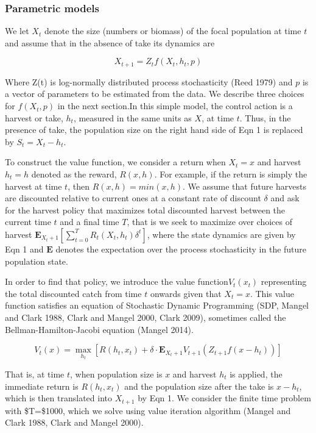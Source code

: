 \documentclass[author-year, 12pt,review]{elsarticle} %
\begin{document}
\subsubsection{Parametric models}\label{parametric-models}

We let $X_t$ denote the size (numbers or biomass) of the focal
population at time $t$ and assume that in the absence of take its
dynamics are

\[ X_{t+1}= Z_t f(X_t, h_t, p) \]

Where Z(t) is log-normally distributed process stochasticity (Reed 1979)
and $p$ is a vector of parameters to be estimated from the data. We
describe three choices for $f(X_t,p)$ in the next section.In this simple
model, the control action is a harvest or take, $h_t$, measured in the
same units as $X$, at time $t$. Thus, in the presence of take, the
population size on the right hand side of Eqn 1 is replaced by
$S_t=X_t-h_t$.

To construct the value function, we consider a return when $X_t=x$ and
harvest $h_t=h$ denoted as the reward, $R(x,h)$. For example, if the
return is simply the harvest at time $t$, then $R(x,h)=min(x,h)$. We
assume that future harvests are discounted relative to current ones at a
constant rate of discount $\delta$ and ask for the harvest policy that
maximizes total discounted harvest between the current time $t$ and a
final time $T$, that is we seek to maximize over choices of harvest
$\mathbf{E}_{X_t+1} [ \sum_{t = 0}^{T}  R_t(X_t, h_t) \delta^t]$, where
the state dynamics are given by Eqn 1 and $\mathbf{E}$ denotes the
expectation over the process stochasticity in the future population
state.

In order to find that policy, we introduce the value function$V_t(x_t)$
representing the total discounted catch from time $t$ onwards given that
$X_t=x$. This value function satisfies an equation of Stochastic Dynamic
Programming (SDP, Mangel and Clark 1988, Clark and Mangel 2000, Clark
2009), sometimes called the Bellman-Hamilton-Jacobi equation (Mangel
2014).

\begin{equation}
V_t(x) = \max_{h_t} \left[R(h_t, x_t) + \delta \cdot \mathbf{E}_{X_t+1} V_{t+1}( Z_{t+1} f(x - h_t)) \right]
\end{equation}

That is, at time $t$, when population size is $x$ and harvest $h_t$ is
applied, the immediate return is $R(h_t, x_t)$ and the population size
after the take is $x-h_t$, which is then translated into $X_{t+1}$ by
Eqn 1. We consider the finite time problem with \$T=\$1000, which we
solve using value iteration algorithm (Mangel and Clark 1988, Clark and
Mangel 2000).
\end{document}
